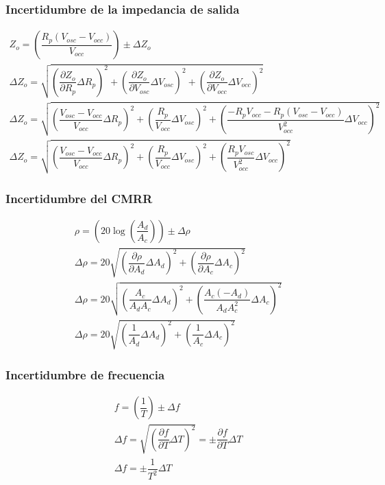 \subsubsection{Incertidumbre de la impedancia de salida}

\begin{gather}
    Z_o = \left(\dfrac{R_p(V_{osc}-V_{occ})}{V_{occ}}\right) \pm \Delta Z_o \nonumber \\[0.2cm]
    \Delta Z_o = \sqrt{\left(\dfrac{\partial Z_o}{\partial R_p}\Delta R_p\right)^2 +\left(\dfrac{\partial Z_o}{\partial V_{osc}}\Delta V_{osc}\right)^2+\left(\dfrac{\partial Z_o}{\partial V_{occ}}\Delta V_{occ}\right)^2} \nonumber \\[0.2cm]
    \Delta Z_o = \sqrt{\left(\dfrac{V_{osc}-V_{occ}}{V_{occ}}\Delta R_p\right)^2 +\left(\dfrac{R_p}{V_{occ}}\Delta V_{osc}\right)^2+\left(\dfrac{-R_pV_{occ}-R_p(V_{osc}-V_{occ})}{ V_{occ}^2}\Delta V_{occ}\right)^2} \nonumber \\[0.2cm]
    \Delta Z_o = \sqrt{\left(\dfrac{V_{osc}-V_{occ}}{V_{occ}}\Delta R_p\right)^2 +\left(\dfrac{R_p}{V_{occ}}\Delta V_{osc}\right)^2+\left(\dfrac{R_pV_{osc}}{ V_{occ}^2}\Delta V_{occ}\right)^2}
\end{gather}

\subsubsection{Incertidumbre del CMRR}

\begin{gather}
    \rho = \left(20\log \left(\dfrac{A_d}{A_c}\right)\right) \pm \Delta \rho \nonumber \\[0.2cm]
    \Delta \rho = 20 \sqrt{\left(\dfrac{\partial \rho}{\partial A_d}\Delta A_d\right)^2 +\left(\dfrac{\partial \rho}{\partial A_c}\Delta A_c\right)^2} \nonumber \\[0.2cm]
    \Delta \rho = 20 \sqrt{\left(\dfrac{A_c}{A_d A_c}\Delta A_d\right)^2 +\left(\dfrac{A_c (-A_d)}{A_d A_c^2}\Delta A_c\right)^2} \nonumber \\[0.2cm]
    \Delta \rho = 20 \sqrt{\left(\dfrac{1}{A_d }\Delta A_d\right)^2 +\left(\dfrac{1}{A_c}\Delta A_c\right)^2}
\end{gather}


\subsubsection{Incertidumbre de frecuencia}

\begin{gather}
    f=\left(\dfrac{1}{T}\right) \pm \Delta f \nonumber \\[0.2cm]
    \Delta f = \sqrt{\left(\dfrac{\partial f}{\partial T} \Delta T\right)^2} = \pm \dfrac{\partial f}{\partial T} \Delta T \nonumber \\[0.2cm]
    \Delta f = \pm \dfrac{1}{T^2}\Delta T
\end{gather}


